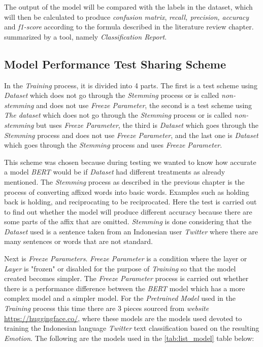 The output of the model will be compared with the labels in the dataset, which will then be calculated to produce \textit{confusion matrix}, \textit{recall, precision, accuracy} and \textit{f1-score} according to the formula described in the literature review chapter. summarized by a tool, namely \textit{Classification Report}.

\subsection{Model Performance Test Sharing Scheme}

In the \textit{Training} process, it is divided into 4 parts. The first is a test scheme using \textit{Dataset} which does not go through the \textit{Stemming} process or is called \textit{non-stemming} and does not use \textit{Freeze Parameter}, the second is a test scheme using \textit{ The dataset} which does not go through the \textit{Stemming} process or is called \textit{non-stemming} but uses \textit{Freeze Parameter}, the third is \textit{Dataset} which goes through the \textit{Stemming} process and does not use \textit {Freeze Parameter}, and the last one is \textit{Dataset} which goes through the \textit{Stemming} process and uses \textit{Freeze Parameter}.

This scheme was chosen because during testing we wanted to know how accurate a model \textit{BERT} would be if \textit{Dataset} had different treatments as already mentioned. The \textit{Stemming} process as described in the previous chapter is the process of converting affixed words into basic words. Examples such as holding back is holding, and reciprocating to be reciprocated. Here the test is carried out to find out whether the model will produce different accuracy because there are some parts of the affix that are omitted. \textit{Stemming} is done considering that the \textit{Dataset} used is a sentence taken from an Indonesian user \textit{Twitter} where there are many sentences or words that are not standard.

Next is \textit{Freeze Parameters}. \textit{Freeze Parameter} is a condition where the layer or \textit{Layer} is "frozen" or disabled for the purpose of \textit{Training} so that the model created becomes simpler. The \textit{Freeze Parameter} process is carried out whether there is a performance difference between the \textit{BERT} model which has a more complex model and a simpler model. For the \textit{Pretrained Model} used in the \textit{Training} process this time there are 3 pieces sourced from \textit{website} \url{https://huggingface.co/}, where these models are the models used devoted to training the Indonesian language \textit{Twitter} text classification based on the resulting \textit{Emotion}. The following are the models used in the \ref{tab:list_model} table below: 

